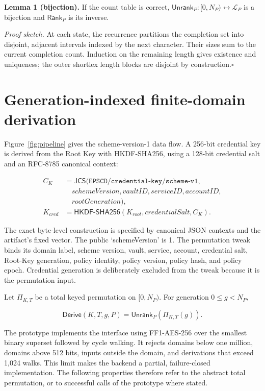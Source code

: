 \documentclass[preprint,12pt]{elsarticle}
\newcommand{\Lang}{\mathcal{L}}
\newcommand{\Rank}{\mathsf{Rank}}
\newcommand{\Unrank}{\mathsf{Unrank}}
\newcommand{\Derive}{\mathsf{Derive}}
\newcommand{\Perm}{\Pi}
\begin{document}
\textbf{Lemma 1 (bijection).} If the count table is correct,
$\Unrank_P:[0,N_P)\leftrightarrow\Lang_P$ is a bijection and $\Rank_P$ is its
inverse.

\textit{Proof sketch.} At each state, the recurrence partitions the completion
set into disjoint, adjacent intervals indexed by the next character. Their
sizes sum to the current completion count. Induction on the remaining length
gives existence and uniqueness; the outer shortlex length blocks are disjoint
by construction.\hfill$\square$

\section{Generation-indexed finite-domain derivation}

Figure~\ref{fig:pipeline} gives the scheme-version-1 data flow. A 256-bit
credential key is derived from the Root Key with HKDF-SHA256, using a 128-bit
credential salt and an RFC-8785 canonical context:



\begin{align}
C_K &= \mathsf{JCS}(\texttt{EPSCD/credential-key/scheme-v1},\nonumber\\
&\quad schemeVersion,vaultID,serviceID,accountID,\nonumber\\
&\quad rootGeneration),\\
K_{cred} &= \mathsf{HKDF\mbox{-}SHA256}(K_{root},credentialSalt,C_K).
\end{align}

The exact byte-level construction is specified by canonical JSON contexts and
the artifact's fixed vector. The public `schemeVersion' is 1. The permutation
tweak binds its domain label, scheme version, vault, service, account,
credential salt, Root-Key generation, policy identity, policy version, policy
hash, and policy epoch.
Credential generation is deliberately excluded from the tweak because it is
the permutation input.

Let $\Perm_{K,T}$ be a total keyed permutation on $[0,N_P)$. For generation
$0\le g<N_P$,

\begin{equation}
\Derive(K,T,g,P)=\Unrank_P(\Perm_{K,T}(g)).
\end{equation}

The prototype implements the interface using FF1-AES-256 over the smallest
binary superset followed by cycle walking. It rejects domains below one
million, domains above 512 bits, inputs outside the domain, and derivations that
exceed 1,024 walks. This limit makes the backend a partial, failure-closed
implementation. The following properties therefore refer to the abstract
total permutation, or to successful calls of the prototype where stated.
\end{document}
